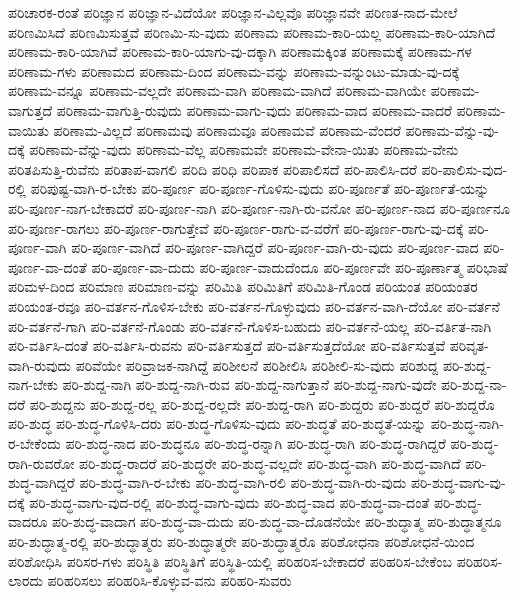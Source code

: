{ಪರಿಚಾರಕ-ರಂತೆ
ಪರಿಜ್ಞಾನ
ಪರಿಜ್ಞಾನ-ವಿದೆಯೋ
ಪರಿಜ್ಞಾನ-ವಿಲ್ಲವೊ
ಪರಿಜ್ಞಾನವೇ
ಪರಿಣತ-ನಾದ-ಮೇಲೆ
ಪರಿಣಮಿಸಿದೆ
ಪರಿಣಮಿಸುತ್ತವೆ
ಪರಿಣಮಿ-ಸು-ವುದು
ಪರಿಣಾಮ
ಪರಿಣಾಮ-ಕಾರಿ-ಯಲ್ಲ
ಪರಿಣಾಮ-ಕಾರಿ-ಯಾಗಿದೆ
ಪರಿಣಾಮ-ಕಾರಿ-ಯಾಗಿವೆ
ಪರಿಣಾಮ-ಕಾರಿ-ಯಾಗು-ವು-ದಕ್ಕಾಗಿ
ಪರಿಣಾಮಕ್ಕಿಂತ
ಪರಿಣಾಮಕ್ಕೆ
ಪರಿಣಾಮ-ಗಳ
ಪರಿಣಾಮ-ಗಳು
ಪರಿಣಾಮದ
ಪರಿಣಾಮ-ದಿಂದ
ಪರಿಣಾಮ-ವನ್ನು
ಪರಿಣಾಮ-ವನ್ನುಂಟು-ಮಾಡು-ವು-ದಕ್ಕೆ
ಪರಿಣಾಮ-ವನ್ನೂ
ಪರಿಣಾಮ-ವಲ್ಲದೇ
ಪರಿಣಾಮ-ವಾಗಿ
ಪರಿಣಾಮ-ವಾಗಿದೆ
ಪರಿಣಾಮ-ವಾಗಿಯೇ
ಪರಿಣಾಮ-ವಾಗುತ್ತದೆ
ಪರಿಣಾಮ-ವಾಗುತ್ತಿ-ರುವುದು
ಪರಿಣಾಮ-ವಾಗು-ವುದು
ಪರಿಣಾಮ-ವಾದ
ಪರಿಣಾಮ-ವಾದರೆ
ಪರಿಣಾಮ-ವಾಯಿತು
ಪರಿಣಾಮ-ವಿಲ್ಲದೆ
ಪರಿಣಾಮವು
ಪರಿಣಾಮವೂ
ಪರಿಣಾಮವೆ
ಪರಿಣಾಮ-ವೆಂದರೆ
ಪರಿಣಾಮ-ವೆನ್ನು-ವು-ದಕ್ಕೆ
ಪರಿಣಾಮ-ವೆನ್ನು-ವುದು
ಪರಿಣಾಮ-ವೆಲ್ಲ
ಪರಿಣಾಮವೇ
ಪರಿಣಾಮ-ವೇನಾ-ಯಿತು
ಪರಿಣಾಮ-ವೇನು
ಪರಿತಪಿಸುತ್ತಿ-ರುವೆನು
ಪರಿತಾಪ-ವಾಗಲಿ
ಪರಿದಿ
ಪರಿಧಿ
ಪರಿಪಾಕ
ಪರಿಪಾಲಿಸದೆ
ಪರಿ-ಪಾಲಿಸಿ-ದರೆ
ಪರಿ-ಪಾಲಿಸು-ವುದ-ರಲ್ಲಿ
ಪರಿಪುಷ್ಟ-ವಾಗಿ-ರ-ಬೇಕು
ಪರಿ-ಪೂರ್ಣ
ಪರಿ-ಪೂರ್ಣ-ಗೊಳಿಸು-ವುದು
ಪರಿ-ಪೂರ್ಣತೆ
ಪರಿ-ಪೂರ್ಣತೆ-ಯನ್ನು
ಪರಿ-ಪೂರ್ಣ-ನಾಗ-ಬೇಕಾದರೆ
ಪರಿ-ಪೂರ್ಣ-ನಾಗಿ
ಪರಿ-ಪೂರ್ಣ-ನಾಗಿ-ರು-ವನೋ
ಪರಿ-ಪೂರ್ಣ-ನಾದ
ಪರಿ-ಪೂರ್ಣನೂ
ಪರಿ-ಪೂರ್ಣ-ರಾಗಲು
ಪರಿ-ಪೂರ್ಣ-ರಾಗುತ್ತೇವೆ
ಪರಿ-ಪೂರ್ಣ-ರಾಗು-ವ-ವರೆಗೆ
ಪರಿ-ಪೂರ್ಣ-ರಾಗು-ವು-ದಕ್ಕೆ
ಪರಿ-ಪೂರ್ಣ-ವಾಗಿ
ಪರಿ-ಪೂರ್ಣ-ವಾಗಿದೆ
ಪರಿ-ಪೂರ್ಣ-ವಾಗಿದ್ದರೆ
ಪರಿ-ಪೂರ್ಣ-ವಾಗಿ-ರು-ವುದು
ಪರಿ-ಪೂರ್ಣ-ವಾದ
ಪರಿ-ಪೂರ್ಣ-ವಾ-ದಂತೆ
ಪರಿ-ಪೂರ್ಣ-ವಾ-ದುದು
ಪರಿ-ಪೂರ್ಣ-ವಾದುದೆಂದೂ
ಪರಿ-ಪೂರ್ಣವೇ
ಪರಿ-ಪೂರ್ಣಾತ್ಮ
ಪರಿಭಾಷೆ
ಪರಿಮಳ-ದಿಂದ
ಪರಿಮಾಣ
ಪರಿಮಾಣ-ವನ್ನು
ಪರಿಮಿತಿ
ಪರಿಮಿತಿಗೆ
ಪರಿಮಿತಿ-ಗೊಂಡ
ಪರಿಯಂತ
ಪರಿಯಂತರ
ಪರಿಯಂತ-ರವೂ
ಪರಿ-ವರ್ತನ-ಗೊಳಿಸ-ಬೇಕು
ಪರಿ-ವರ್ತನ-ಗೊಳ್ಳುವುದು
ಪರಿ-ವರ್ತನ-ವಾಗಿ-ದೆಯೋ
ಪರಿ-ವರ್ತನೆ
ಪರಿ-ವರ್ತನೆ-ಗಾಗಿ
ಪರಿ-ವರ್ತನೆ-ಗೊಂಡು
ಪರಿ-ವರ್ತನೆ-ಗೊಳಿಸ-ಬಹುದು
ಪರಿ-ವರ್ತನೆ-ಯಲ್ಲ
ಪರಿ-ವರ್ತಿತ-ನಾಗಿ
ಪರಿ-ವರ್ತಿಸಿ-ದಂತೆ
ಪರಿ-ವರ್ತಿಸಿ-ರುವನು
ಪರಿ-ವರ್ತಿಸುತ್ತದೆ
ಪರಿ-ವರ್ತಿಸುತ್ತದೆಯೋ
ಪರಿ-ವರ್ತಿಸುತ್ತವೆ
ಪರಿವೃತ-ವಾಗಿ-ರುವುದು
ಪರಿವೆಯೇ
ಪರಿವ್ರಾಜಕ-ನಾಗಿದ್ದೆ
ಪರಿಶೀಲನೆ
ಪರಿಶೀಲಿಸಿ
ಪರಿಶೀಲಿ-ಸು-ವುದು
ಪರಿಶುದ್ದ
ಪರಿ-ಶುದ್ದ-ನಾಗ-ಬೇಕು
ಪರಿ-ಶುದ್ದ-ನಾಗಿ
ಪರಿ-ಶುದ್ದ-ನಾಗಿ-ರುವ
ಪರಿ-ಶುದ್ದ-ನಾಗುತ್ತಾನೆ
ಪರಿ-ಶುದ್ದ-ನಾಗು-ವುದೇ
ಪರಿ-ಶುದ್ದ-ನಾ-ದರೆ
ಪರಿ-ಶುದ್ದನು
ಪರಿ-ಶುದ್ದ-ರಲ್ಲ
ಪರಿ-ಶುದ್ದ-ರಲ್ಲದೇ
ಪರಿ-ಶುದ್ದ-ರಾಗಿ
ಪರಿ-ಶುದ್ದರು
ಪರಿ-ಶುದ್ದರೆ
ಪರಿ-ಶುದ್ದರೊ
ಪರಿ-ಶುದ್ಧ
ಪರಿ-ಶುದ್ಧ-ಗೊಳಿಸಿ-ದರು
ಪರಿ-ಶುದ್ಧ-ಗೊಳಿಸು-ವುದು
ಪರಿ-ಶುದ್ಧತೆ
ಪರಿ-ಶುದ್ಧತೆ-ಯನ್ನು
ಪರಿ-ಶುದ್ಧ-ನಾಗಿ-ರ-ಬೇಕೆಂದು
ಪರಿ-ಶುದ್ಧ-ನಾದ
ಪರಿ-ಶುದ್ಧನೂ
ಪರಿ-ಶುದ್ಧ-ರನ್ನಾಗಿ
ಪರಿ-ಶುದ್ಧ-ರಾಗಿ
ಪರಿ-ಶುದ್ಧ-ರಾಗಿದ್ದರೆ
ಪರಿ-ಶುದ್ಧ-ರಾಗಿ-ರುವರೋ
ಪರಿ-ಶುದ್ಧ-ರಾದರೆ
ಪರಿ-ಶುದ್ಧರೇ
ಪರಿ-ಶುದ್ಧ-ವಲ್ಲದೇ
ಪರಿ-ಶುದ್ಧ-ವಾಗಿ
ಪರಿ-ಶುದ್ಧ-ವಾಗಿದೆ
ಪರಿ-ಶುದ್ಧ-ವಾಗಿದ್ದರೆ
ಪರಿ-ಶುದ್ಧ-ವಾಗಿ-ರ-ಬೇಕು
ಪರಿ-ಶುದ್ಧ-ವಾಗಿ-ರಲಿ
ಪರಿ-ಶುದ್ಧ-ವಾಗಿ-ರು-ವುದು
ಪರಿ-ಶುದ್ಧ-ವಾಗು-ವು-ದಕ್ಕೆ
ಪರಿ-ಶುದ್ಧ-ವಾಗು-ವುದ-ರಲ್ಲಿ
ಪರಿ-ಶುದ್ಧ-ವಾಗು-ವುದು
ಪರಿ-ಶುದ್ಧ-ವಾದ
ಪರಿ-ಶುದ್ಧ-ವಾ-ದಂತೆ
ಪರಿ-ಶುದ್ಧ-ವಾದರೂ
ಪರಿ-ಶುದ್ಧ-ವಾದಾಗ
ಪರಿ-ಶುದ್ಧ-ವಾ-ದುದು
ಪರಿ-ಶುದ್ಧ-ವಾ-ದೊಡನೆಯೇ
ಪರಿ-ಶುದ್ಧಾತ್ಮ
ಪರಿ-ಶುದ್ಧಾತ್ಮನೂ
ಪರಿ-ಶುದ್ಧಾತ್ಮ-ರಲ್ಲಿ
ಪರಿ-ಶುದ್ಧಾತ್ಮರು
ಪರಿ-ಶುದ್ಧಾತ್ಮರೇ
ಪರಿ-ಶುದ್ಧಾತ್ಮರೊ
ಪರಿಶೋಧನಾ
ಪರಿಶೋಧನೆ-ಯಿಂದ
ಪರಿಶೋಧಿಸಿ
ಪರಿಸರ-ಗಳು
ಪರಿಸ್ಥಿತಿ
ಪರಿಸ್ಥಿತಿಗೆ
ಪರಿಸ್ಥಿತಿ-ಯಲ್ಲಿ
ಪರಿಹರಿಸ-ಬೇಕಾದರೆ
ಪರಿಹರಿಸ-ಬೇಕೆಂಬ
ಪರಿಹರಿಸ-ಲಾರದು
ಪರಿಹರಿಸಲು
ಪರಿಹರಿಸಿ-ಕೊಳ್ಳುವ-ವನು
ಪರಿಹರಿ-ಸುವರು
}

